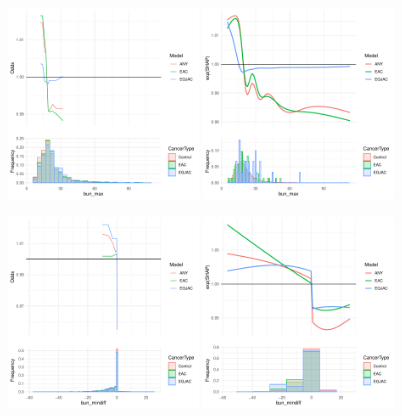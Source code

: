 \documentclass[12pt]{article}
\begin{document}
\begin{figure}[h]
\centering
\includegraphics[width=0.45\textwidth]{pdp/bun_max.pdf}
\includegraphics[width=0.45\textwidth]{shap/bun_max.pdf}
\end{figure}
\begin{figure}[h]
\centering
\includegraphics[width=0.45\textwidth]{pdp/bun_mindiff.pdf}
\includegraphics[width=0.45\textwidth]{shap/bun_mindiff.pdf}
\end{figure}
\end{document}
